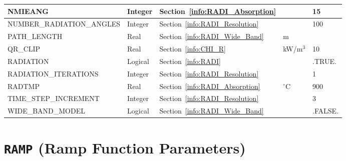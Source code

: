 \documentclass[11pt]{book}
\begin{document}
\begin{longtable}{@{\extracolsep{\fill}}|l|l|l|l|l|}
{\ct NMIEANG                  }     & Integer       & Section~\ref{info:RADI_Absorption}        &                   & 15                \\ \hline
{\ct NUMBER\_RADIATION\_ANGLES}     & Integer       & Section~\ref{info:RADI_Resolution}        &                   & 100               \\ \hline
{\ct PATH\_LENGTH }                 & Real          & Section~\ref{info:RADI_Wide_Band}         &   m               &                   \\ \hline
{\ct QR\_CLIP                  }    & Real          & Section~\ref{info:CHI_R}                  & kW/m$^3$          & 10                \\ \hline
{\ct RADIATION}                     & Logical       & Section~\ref{info:RADI}                   &                   & {\ct .TRUE.}      \\ \hline
{\ct RADIATION\_ITERATIONS}         & Integer       & Section~\ref{info:RADI_Resolution}        &                   & 1                 \\ \hline
{\ct RADTMP                   }     & Real          & Section~\ref{info:RADI_Absorption}        & $^\circ$C         & 900               \\ \hline
{\ct TIME\_STEP\_INCREMENT}         & Integer       & Section~\ref{info:RADI_Resolution}        &                   & 3                 \\ \hline
{\ct WIDE\_BAND\_MODEL    }         & Logical       & Section~\ref{info:RADI_Wide_Band}         &                   & {\ct .FALSE.}     \\ \hline
\end{longtable}

\vspace{\baselineskip}


\section{\texorpdfstring{{\tt RAMP}}{RAMP} (Ramp Function Parameters)}
\end{document}

